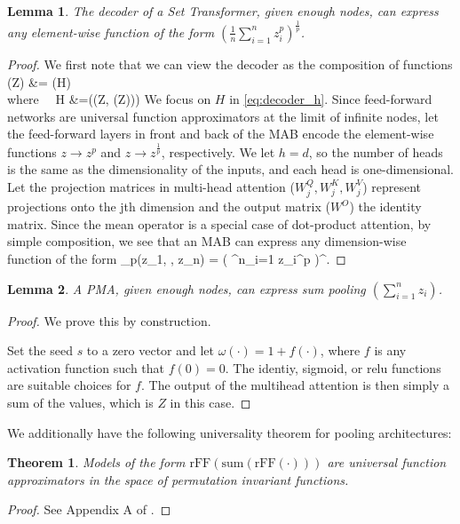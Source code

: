 \documentclass{article}
\newtheorem{theorem}{Theorem}
\newtheorem{lemma}{Lemma}
\def\[#1\]{\begin{align}#1\end{align}}
\begin{document}
\begin{lemma}
The decoder of a Set Transformer, given enough nodes, can express any element-wise function of the form $\left( \frac{1}{n} \sum^n_{i=1} z_i^p \right)^\frac{1}{p}$.
\end{lemma}
\begin{proof}
We first note that we can view the decoder as the composition of functions
\[
\mathrm{Decoder}(Z) &= (H) \\
\textrm{where} \ \ H &=((Z, (Z))) \label{eq:decoder_h}
\]
We focus on $H$ in \eqref{eq:decoder_h}.
Since feed-forward networks are universal function approximators at the limit of infinite nodes, let the feed-forward layers in front and back of the MAB encode the element-wise functions $z \rightarrow z^p$ and $z \rightarrow z^{\frac{1}{p}}$, respectively.
We let $h=d$, so the number of heads is the same as the dimensionality of the inputs, and each head is one-dimensional.
Let the projection matrices in multi-head attention ($W_j^Q, W_j^K, W_j^V$) represent projections onto the jth dimension and the output matrix ($W^O$) the identity matrix.
Since the mean operator is a special case of dot-product attention, by simple composition, we see that an MAB can express any dimension-wise function of the form
\[
M_p(z_1, \cdots, z_n) = \left(  \sum^n_{i=1} z_i^p \right)^.
\]
\end{proof}

\begin{lemma}
\label{lem:sum}
A PMA, given enough nodes, can express sum pooling $\left( \sum^n_{i=1} z_i \right)$.
\end{lemma}
\begin{proof}
We prove this by construction.

Set the seed $s$ to a zero vector and let $\omega(\cdot)=1+f(\cdot)$, where $f$ is any activation function such that $f(0)=0$.
The identiy, sigmoid, or relu functions are suitable choices for $f$.
The output of the multihead attention is then simply a sum of the values, which is $Z$ in this case.
\end{proof}

We additionally have the following universality theorem for pooling architectures:
\begin{theorem}
\label{thm:univ}
Models of the form $\mathrm{rFF}(\mathrm{sum}(\mathrm{rFF}(\cdot)))$ are universal function approximators in the space of permutation invariant functions.
\end{theorem}
\begin{proof}
See Appendix A of \citet{Zaheer2017}.
\end{proof}
\end{document}
